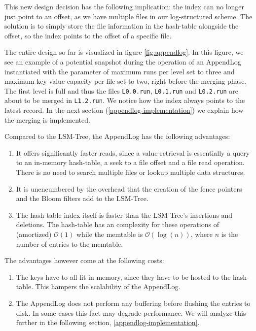 This new design decision has the following implication: the index can no longer just point to an offset, as we have multiple files in our log-structured scheme.
The solution is to simply store the file information in the hash-table alongside the offset, so the index points to the offset of a specific file.

The entire design so far is visualized in figure \ref{fig:appendlog}.
In this figure, we see an example of a potential snapshot during the operation of an AppendLog instantiated with the parameter of maximum runs per level set to three and maximum key-value capacity per file set to two, right before the merging phase. The first level is full and thus the files \verb|L0.0.run|, \verb|L0.1.run| and \verb|L0.2.run| are about to be merged in \verb|L1.2.run|.
We notice how the index always points to the latest record.
In the next section (\ref{appendlog-implementation}) we explain how the merging is implemented.

Compared to the LSM-Tree, the AppendLog has the following advantages:
\begin{enumerate}
    \item It offers significantly faster reads, since a value retrieval is essentially a query to an in-memory hash-table, a seek to a file offset and a file read operation. There is no need to search multiple files or lookup multiple data structures.
    \item It is unencumbered by the overhead that the creation of the fence pointers and the Bloom filters add to the LSM-Tree.
    \item The hash-table index itself is faster than the LSM-Tree's insertions and deletions. The hash-table has an complexity for these operations of (amortized) $\mathcal{O}(1)$ while the memtable is $\mathcal{O}(\log{}(n))$, where $n$ is the number of entries to the memtable.
\end{enumerate}

The advantages however come at the following costs:
\begin{enumerate}
    \item The keys have to all fit in memory, since they have to be hosted to the hash-table. This hampers the scalability of the AppendLog.
    \item The AppendLog does not perform any buffering before flushing the entries to disk. In some cases this fact may degrade performance. We will analyze this further in the following section, \ref{appendlog-implementation}.
\end{enumerate}

